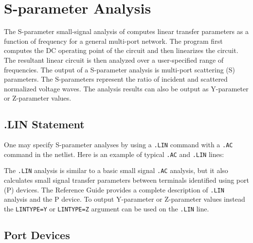 \clearpage


\section{S-parameter Analysis}
\label{SP_Analysis}
\label{SP_Sweep_Overview}
  
 

The S-parameter small-signal analysis of \Xyce{} computes linear
transfer parameters as a function of frequency for a general
multi-port network. The program first computes the DC operating point
of the circuit and then linearizes the circuit. The resultant linear
circuit is then analyzed over a user-specified range of
frequencies. The output of a S-parameter analysis is multi-port
scattering (S) parameters. The S-parameters represent the ratio of
incident and scattered normalized voltage waves.  The analysis results
can also be output as Y-parameter or Z-parameter values.

\subsection{.LIN Statement}

One may specify S-parameter analyses by using a \verb|.LIN| command with a \verb|.AC| command in the netlist.
Here is an example of typical \verb|.AC| and \verb|.LIN| lines:


The \verb|.LIN| analysis is similar to a basic small signal \verb|.AC|
analysis, but it also calculates small signal transfer parameters
between terminals identified using port (P) devices. The \Xyce{}
Reference Guide\ReferenceGuide{} provides a complete description of
\verb|.LIN| analysis and the P device.  To output Y-parameter or
Z-parameter values instead the \texttt{LINTYPE=Y} or
\texttt{LINTYPE=Z} argument can be used on the \texttt{.LIN} line.

\subsection{Port Devices}
\label{SP_Port}

